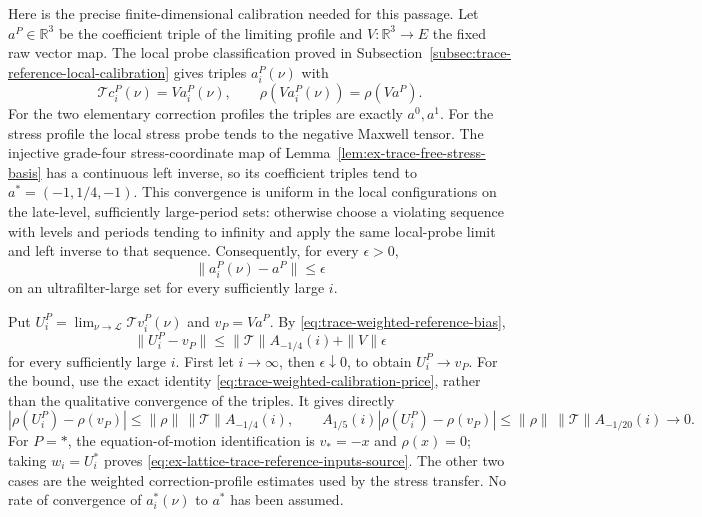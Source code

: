 Here is the precise finite-dimensional calibration needed for this
passage. Let $a^P\in\mathbb R^3$ be the coefficient triple of the
limiting profile and $V:\mathbb R^3\to E$ the fixed raw vector map.
The local probe classification proved in
Subsection~\ref{subsec:trace-reference-local-calibration} gives triples $a_i^P(\nu)$ with
\begin{equation}
 \mathcal T c_i^P(\nu)=V a_i^P(\nu),\qquad
 \rho(Va_i^P(\nu))=\rho(Va^P).
 \label{eq:trace-weighted-calibration-price}
\end{equation}
For the two elementary correction profiles the triples are exactly
$a^0,a^1$. For the stress profile the local stress probe tends to the
negative Maxwell tensor. The injective grade-four stress-coordinate map
of Lemma~\ref{lem:ex-trace-free-stress-basis} has a continuous left inverse,
so its coefficient triples tend to $a^*=(-1,1/4,-1)$. This convergence
is uniform in the local configurations on the late-level, sufficiently
large-period sets: otherwise choose a violating sequence with levels and
periods tending to infinity and apply the same local-probe limit and
left inverse to that sequence. Consequently, for every $\epsilon>0$,
\[
 \|a_i^P(\nu)-a^P\|\le\epsilon
\]
on an ultrafilter-large set for every sufficiently large $i$.

Put $U_i^P=\lim_{\nu\to\mathcal L}\mathcal T v_i^P(\nu)$ and
$v_P=Va^P$. By \eqref{eq:trace-weighted-reference-bias},
\[
 \|U_i^P-v_P\|
 \le\|\mathcal T\|A_{-1/4}(i)+\|V\|\epsilon
\]
for every sufficiently large $i$. First let $i\to\infty$, then
$\epsilon\downarrow0$, to obtain $U_i^P\to v_P$.
For the bound, use the exact identity
\eqref{eq:trace-weighted-calibration-price}, rather than the qualitative
convergence of the triples. It gives directly
\[
 |\rho(U_i^P)-\rho(v_P)|
 \le\|\rho\|\,\|\mathcal T\|A_{-1/4}(i),\qquad
 A_{1/5}(i)|\rho(U_i^P)-\rho(v_P)|
 \le\|\rho\|\,\|\mathcal T\|A_{-1/20}(i)\longrightarrow0.
\]
For $P=*$, the equation-of-motion identification is $v_*=-x$ and
$\rho(x)=0$; taking $w_i=U_i^*$ proves
\eqref{eq:ex-lattice-trace-reference-inputs-source}. The other two cases
are the weighted correction-profile estimates used by the stress transfer.
No rate of convergence of $a_i^*(\nu)$ to $a^*$ has been assumed.


